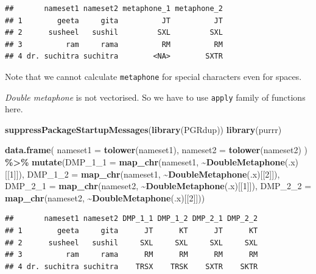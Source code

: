 \documentclass[
]{book}
\newenvironment{Shaded}{\begin{snugshade}}{\end{snugshade}}
\newcommand{\AttributeTok}[1]{\textcolor[rgb]{0.13,0.29,0.53}{#1}}
\newcommand{\DecValTok}[1]{\textcolor[rgb]{0.00,0.00,0.81}{#1}}
\newcommand{\FunctionTok}[1]{\textcolor[rgb]{0.13,0.29,0.53}{\textbf{#1}}}
\newcommand{\NormalTok}[1]{#1}
\newcommand{\SpecialCharTok}[1]{\textcolor[rgb]{0.81,0.36,0.00}{\textbf{#1}}}
\begin{document}
\begin{verbatim}
##       nameset1 nameset2 metaphone_1 metaphone_2
## 1        geeta     gita          JT          JT
## 2      susheel   sushil         SXL         SXL
## 3          ram     rama          RM          RM
## 4 dr. suchitra suchitra        <NA>        SXTR
\end{verbatim}

Note that we cannot calculate \texttt{metaphone} for special characters even for spaces.

\emph{Double metaphone} is not vectorised. So we have to use \texttt{apply} family of functions here.

\begin{Shaded}
\begin{Highlighting}[]
\FunctionTok{suppressPackageStartupMessages}\NormalTok{(}\FunctionTok{library}\NormalTok{(PGRdup))}
\FunctionTok{library}\NormalTok{(purrr)}

\FunctionTok{data.frame}\NormalTok{(}
  \AttributeTok{nameset1 =} \FunctionTok{tolower}\NormalTok{(nameset1),}
  \AttributeTok{nameset2 =} \FunctionTok{tolower}\NormalTok{(nameset2)}
\NormalTok{) }\SpecialCharTok{\%\textgreater{}\%} 
  \FunctionTok{mutate}\NormalTok{(}\AttributeTok{DMP\_1\_1 =} \FunctionTok{map\_chr}\NormalTok{(nameset1, }\SpecialCharTok{\textasciitilde{}}\FunctionTok{DoubleMetaphone}\NormalTok{(.x)[[}\DecValTok{1}\NormalTok{]]),}
         \AttributeTok{DMP\_1\_2 =} \FunctionTok{map\_chr}\NormalTok{(nameset1, }\SpecialCharTok{\textasciitilde{}}\FunctionTok{DoubleMetaphone}\NormalTok{(.x)[[}\DecValTok{2}\NormalTok{]]),}
         \AttributeTok{DMP\_2\_1 =} \FunctionTok{map\_chr}\NormalTok{(nameset2, }\SpecialCharTok{\textasciitilde{}}\FunctionTok{DoubleMetaphone}\NormalTok{(.x)[[}\DecValTok{1}\NormalTok{]]),}
         \AttributeTok{DMP\_2\_2 =} \FunctionTok{map\_chr}\NormalTok{(nameset2, }\SpecialCharTok{\textasciitilde{}}\FunctionTok{DoubleMetaphone}\NormalTok{(.x)[[}\DecValTok{2}\NormalTok{]]))}
\end{Highlighting}
\end{Shaded}

\begin{verbatim}
##       nameset1 nameset2 DMP_1_1 DMP_1_2 DMP_2_1 DMP_2_2
## 1        geeta     gita      JT      KT      JT      KT
## 2      susheel   sushil     SXL     SXL     SXL     SXL
## 3          ram     rama      RM      RM      RM      RM
## 4 dr. suchitra suchitra    TRSX    TRSK    SXTR    SKTR
\end{verbatim}
\end{document}
